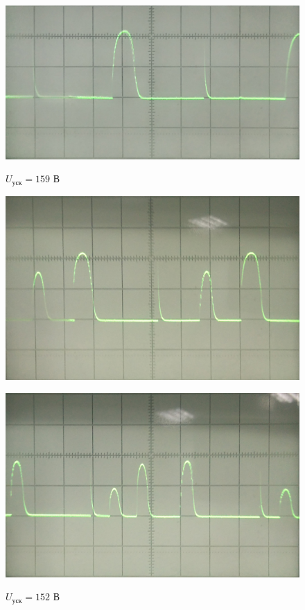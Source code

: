 \newpage
\begin{figure}[h]
	\begin{minipage}[h]{0.45\linewidth}
		\centering
		\includegraphics[width=\textwidth]{img/img2}
		\caption{$U_{\text{уск}}=159$ В}
		\label{fig:img2}
	\end{minipage}
	\hfill
	\begin{minipage}[h]{0.45\linewidth}
		\centering
		{\includegraphics[width=\textwidth]{img/img3}}
		\caption{$U_{\text{уск}}=152$ В}
		\label{fig:img3}
	\end{minipage}
	\vfill
	\vspace{1em}
	\begin{minipage}[h]{0.45\linewidth}
		\centering
		{\includegraphics[width=\textwidth]{img/img4}}

\end{minipage}
\end{figure}
